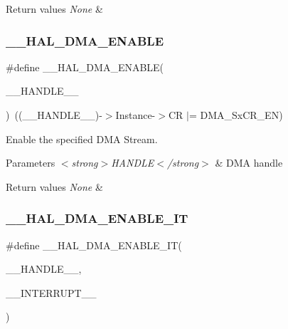 \begin{DoxyRetVals}{Return values}
{\em None} & \\
\hline
\end{DoxyRetVals}
\mbox{\label{group___d_m_a_ga93900b3ef3f87ef924eb887279a434b4}} 
\subsubsection{\texorpdfstring{\_\_HAL\_DMA\_ENABLE}{\_\_HAL\_DMA\_ENABLE}}
{\footnotesize\ttfamily \#define \+\_\+\+\_\+\+H\+A\+L\+\_\+\+D\+M\+A\+\_\+\+E\+N\+A\+B\+LE(\begin{DoxyParamCaption}\item[{}]{\+\_\+\+\_\+\+H\+A\+N\+D\+L\+E\+\_\+\+\_\+ }\end{DoxyParamCaption})~((\+\_\+\+\_\+\+H\+A\+N\+D\+L\+E\+\_\+\+\_\+)-\/$>$Instance-\/$>$CR $\vert$=  D\+M\+A\+\_\+\+Sx\+C\+R\+\_\+\+EN)}



Enable the specified D\+MA Stream. 


\begin{DoxyParams}{Parameters}
{\em $<$strong$>$\+H\+A\+N\+D\+L\+E$<$/strong$>$} & D\+MA handle \\
\hline
\end{DoxyParams}

\begin{DoxyRetVals}{Return values}
{\em None} & \\
\hline
\end{DoxyRetVals}
\mbox{\label{group___d_m_a_ga2124233229c04ca90b790cd8cddfa98b}} 
\subsubsection{\texorpdfstring{\_\_HAL\_DMA\_ENABLE\_IT}{\_\_HAL\_DMA\_ENABLE\_IT}}
{\footnotesize\ttfamily \#define \+\_\+\+\_\+\+H\+A\+L\+\_\+\+D\+M\+A\+\_\+\+E\+N\+A\+B\+L\+E\+\_\+\+IT(\begin{DoxyParamCaption}\item[{}]{\+\_\+\+\_\+\+H\+A\+N\+D\+L\+E\+\_\+\+\_\+,  }\item[{}]{\+\_\+\+\_\+\+I\+N\+T\+E\+R\+R\+U\+P\+T\+\_\+\+\_\+ }\end{DoxyParamCaption})}

